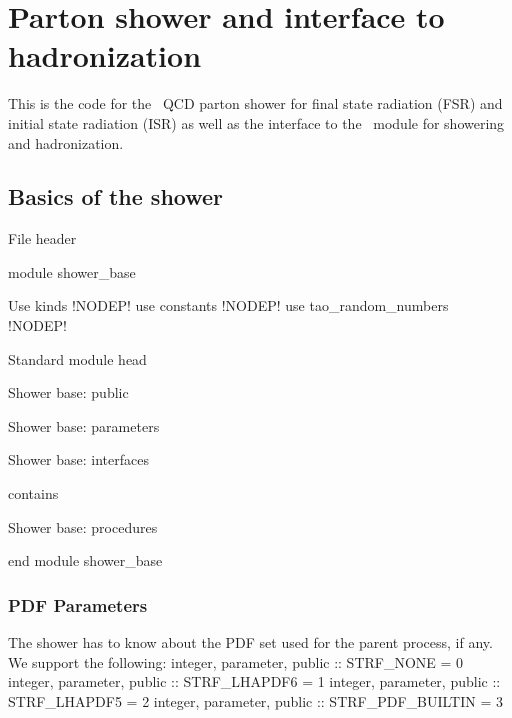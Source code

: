 \chapter{Parton shower and interface to hadronization}

This is the code for the \whizard\ QCD parton shower for final state
radiation (FSR) and initial state radiation (ISR) as well as the interface
to the \pythia\ module for showering and hadronization.

\section{Basics of the shower}
\endmoddef
\LA{}File header\RA{}

module shower_base

\LA{}Use kinds\RA{} !NODEP!
  use constants !NODEP!
  use tao_random_numbers !NODEP!

\LA{}Standard module head\RA{}

\LA{}Shower base: public\RA{}

\LA{}Shower base: parameters\RA{}

\LA{}Shower base: interfaces\RA{}

contains

\LA{}Shower base: procedures\RA{}

end module shower_base
\eatline
\nwendcode{}\nwdocspar
\subsection{PDF Parameters}
The shower has to know about the PDF set used for the parent process,
if any.  We support the following:
\nwenddocs{}\endmoddef
  integer, parameter, public :: STRF_NONE = 0
  integer, parameter, public :: STRF_LHAPDF6 = 1
  integer, parameter, public :: STRF_LHAPDF5 = 2
  integer, parameter, public :: STRF_PDF_BUILTIN = 3
  
\eatline
\nwendcode{}    
